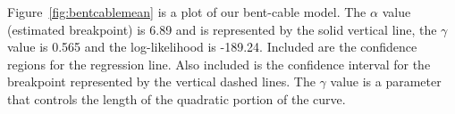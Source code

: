 Figure~\ref{fig:bentcablemean} is a plot of our bent-cable model. The $\alpha$ value (estimated breakpoint) is 6.89 and is represented by the solid vertical line, the $\gamma$ value is 0.565 and the log-likelihood is -189.24. Included are the confidence regions for the regression line. Also included is the confidence interval for the breakpoint represented by the vertical dashed lines. The $\gamma$ value is a parameter that controls the length of the quadratic portion of the curve.
